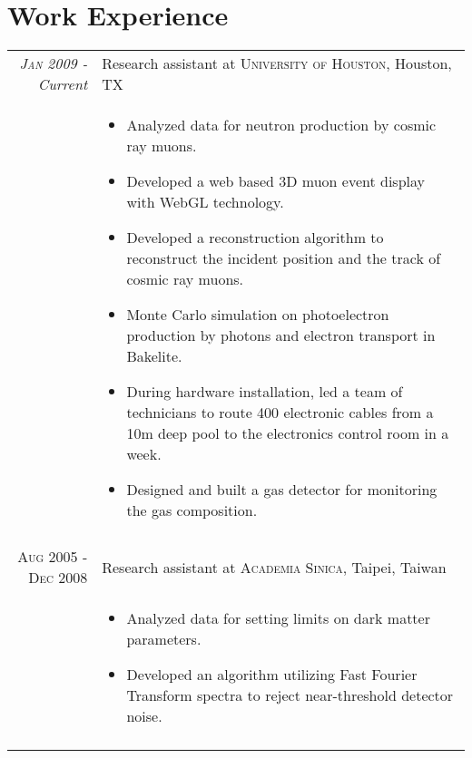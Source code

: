 \documentclass[11pt]{article} %
\begin{document}

\section{Work Experience}

\begin{tabular}{r|p{12cm}}
\emph{\textsc{Jan 2009} - Current} & Research assistant at \textsc{University of Houston}, Houston, TX \\
& \small
\begin{itemize}
  \item	Analyzed data for neutron production by cosmic ray muons.
  \item Developed a web based 3D muon event display with WebGL technology.
  \item Developed a reconstruction algorithm to reconstruct the incident position and the track of cosmic ray muons.
  \item Monte Carlo simulation on photoelectron production by photons and electron transport in Bakelite.
  \item During hardware installation, led a team of technicians to route 400 electronic cables from a 10m deep pool to the electronics control room in a week.
  \item Designed and built a gas detector for monitoring the gas composition.
\end{itemize}\\
\multicolumn{2}{c}{} \\


\textsc{Aug 2005 - Dec 2008} & Research assistant at \textsc{Academia Sinica}, Taipei, Taiwan \\
& \small
\begin{itemize}
  \item Analyzed data for setting limits on dark matter parameters.
  \item Developed an algorithm utilizing Fast Fourier Transform spectra to reject near-threshold detector noise.
\end{itemize}
\\
\multicolumn{2}{c}{} \\
\end{tabular}\newpage
\end{document}
